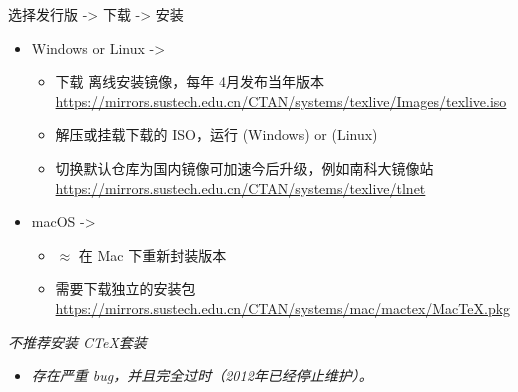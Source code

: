 \begin{frame}[fragile]{选择发行版 -> 下载 -> 安装}
	\begin{itemize}
		\item Windows or Linux -> \texlive
		      \begin{itemize}
			      \item 下载 \texlive 离线安装镜像，每年 4月发布当年版本 \url{https://mirrors.sustech.edu.cn/CTAN/systems/texlive/Images/texlive.iso}
			      \item 解压或挂载下载的 ISO，运行  (Windows) or  (Linux)
			      \item 切换默认仓库为国内镜像可加速今后升级，例如南科大镜像站 \url{https://mirrors.sustech.edu.cn/CTAN/systems/texlive/tlnet}
		      \end{itemize}
		\item macOS -> \mactex
		      \begin{itemize}
			      \item $\approx$ \texlive 在 Mac 下重新封装版本
			      \item 需要下载独立的安装包 \url{https://mirrors.sustech.edu.cn/CTAN/systems/mac/mactex/MacTeX.pkg}
		      \end{itemize}
	\end{itemize}
	\emph{不推荐安装 C\TeX 套装}
	\begin{itemize}
		\item \emph{存在严重 bug，并且完全过时（2012年已经停止维护）。}
	\end{itemize}
\end{frame}

